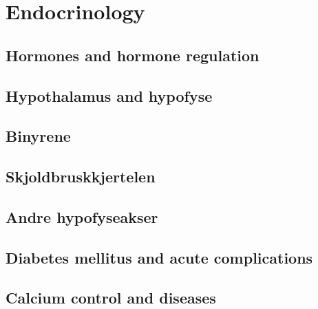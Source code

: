 \section{Endocrinology}

\subsection{Hormones and hormone regulation}


\subsection{Hypothalamus and hypofyse}

\subsection{Binyrene}

\subsection{Skjoldbruskkjertelen}

\subsection{Andre hypofyseakser}

\subsection{Diabetes mellitus and acute complications}

\subsection{Calcium control and diseases}
